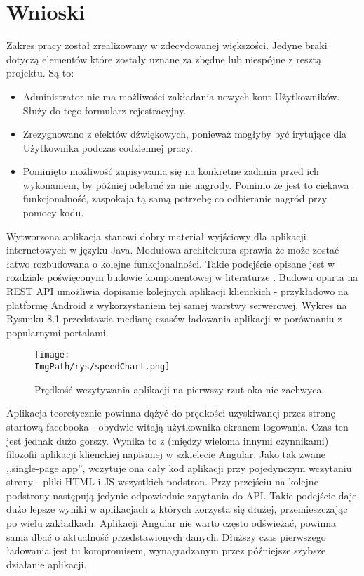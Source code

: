 \documentclass[a4paper,12pt,twoside,openany]{report}
\newcommand{\ImgPath}{.}
\begin{document}
\chapter{Wnioski}
\label{Ending}
Zakres pracy został zrealizowany w zdecydowanej większości. Jedyne braki dotyczą elementów które zostały uznane za zbędne lub niespójne z resztą projektu. Są to:
\begin{itemize}
 \item Administrator nie ma możliwości zakładania nowych kont Użytkowników. Służy do tego formularz rejestracyjny. 
 \item Zrezygnowano z efektów dźwiękowych, ponieważ mogłyby być irytujące dla Użytkownika podczas codziennej pracy.
 \item Pominięto możliwość zapisywania się na konkretne zadania przed ich wykonaniem, by później odebrać za nie nagrody. Pomimo że jest to ciekawa funkcjonalność, zaspokaja tą samą potrzebę co odbieranie nagród przy pomocy kodu.
 \end{itemize}
 Wytworzona aplikacja stanowi dobry materiał wyjściowy dla aplikacji internetowych w języku Java. Modułowa architektura sprawia że może zostać łatwo rozbudowana o kolejne funkcjonalności. Takie podejście opisane jest w rozdziale poświęconym budowie komponentowej w literaturze \cite{Inzynieria1}. Budowa oparta na REST API umożliwia dopisanie kolejnych aplikacji klienckich - przykładowo na platformę Android z wykorzystaniem tej samej warstwy serwerowej.
Wykres na Rysunku 8.1 przedstawia medianę czasów ładowania aplikacji w porównaniu z popularnymi portalami. 
				\begin{figure}[!htbp]
					\begin{center}
						\centering
						\texttt{[image: \\ImgPath/rys/speedChart.png]}
					\end{center}
					\caption{Prędkość wczytywania aplikacji na pierwszy rzut oka nie zachwyca.}
					\label{UMLTS}
				\end{figure}
Aplikacja teoretycznie powinna dążyć do prędkości uzyskiwanej przez stronę startową facebooka - obydwie witają użytkownika ekranem logowania. Czas ten jest jednak dużo gorszy. Wynika to z (między wieloma innymi czynnikami) filozofii aplikacji klienckiej napisanej w szkielecie Angular. Jako tak zwane ,,single-page app'', wczytuje ona cały kod aplikacji przy pojedynczym wczytaniu strony  - pliki HTML i JS wszystkich podstron. Przy przejściu na kolejne podstrony następują jedynie odpowiednie zapytania do API. Takie podejście daje dużo lepsze wyniki w aplikacjach z których korzysta się dłużej, przemieszczając po wielu zakładkach. Aplikacji Angular nie warto często odświeżać, powinna sama dbać o aktualność przedstawionych danych. Dłuższy czas pierwszego ładowania jest tu kompromisem, wynagradzanym przez późniejsze szybsze działanie aplikacji.\\
\end{document}
